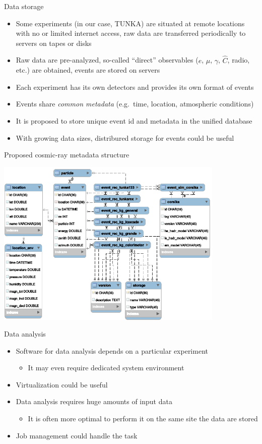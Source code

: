\documentclass[18pt]{beamer}
\newcommand{\itemarrow}{\scriptsize\raise1.25pt\hbox{\textcolor{kit-green100}{$\blacktriangleright$}}}
\newcommand{\concl}[1]{\item[\itemarrow]\textcolor{kit-green100}{#1}}
\begin{document}
\begin{frame}{Data storage}
\begin{itemize}
  \item Some experiments (in our case, TUNKA) are situated at remote locations with no or limited internet access, raw data are transferred periodically to servers on tapes or disks
  \item Raw data are pre-analyzed, so-called ``direct'' observables ($e$, $\mu$, $\gamma$, $\hat{C}$, radio, etc.) are obtained, events are stored on servers
  \item Each experiment has its own detectors and provides its own format of events
  \item Events share \emph{common metadata} (e.g.\ time, location, atmospheric conditions)
  \item It is proposed to store unique event id and metadata in the unified database
  \item With growing data sizes, distribured storage for events could be useful
\end{itemize}
\end{frame}

\begin{frame}{Proposed cosmic-ray metadata structure}
\vspace{-1.5em}
\begin{center}
\includegraphics[width=0.82\textwidth]{pics/metadata.eps}
\end{center}
\end{frame}

\begin{frame}{Data analysis}
\begin{itemize}
  \item Software for data analysis depends on a particular experiment
  \begin{itemize}
    \item It may even require dedicated system environment
  \end{itemize}
  \concl{Virtualization could be useful}
  \item Data analysis requires huge amounts of input data
  \begin{itemize}
    \item It is often more optimal to perform it on the same site the data are stored
  \end{itemize}
  \concl{Job management could handle the task}
\end{itemize}
\end{frame}
\end{document}
